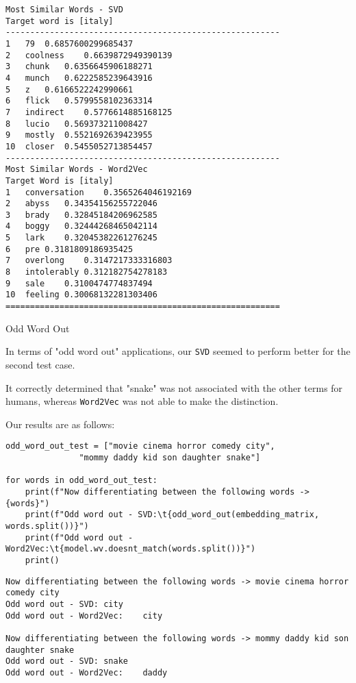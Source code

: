 \documentclass[12pt, letterpaper]{article}
\begin{document}
\begin{lstlisting}
Most Similar Words - SVD
Target word is [italy]
--------------------------------------------------------
1	79	0.6857600299685437
2	coolness	0.6639872949390139
3	chunk	0.6356645906188271
4	munch	0.6222585239643916
5	z	0.6166522242990661
6	flick	0.5799558102363314
7	indirect	0.5776614885168125
8	lucio	0.569373211008427
9	mostly	0.5521692639423955
10	closer	0.5455052713854457
--------------------------------------------------------
Most Similar Words - Word2Vec
Target Word is [italy]
1	conversation	0.3565264046192169
2	abyss	0.34354156255722046
3	brady	0.32845184206962585
4	boggy	0.32444268465042114
5	lark	0.32045382261276245
6	pre	0.3181809186935425
7	overlong	0.3147217333316803
8	intolerably	0.312182754278183
9	sale	0.3100474774837494
10	feeling	0.30068132281303406
========================================================
\end{lstlisting}

{\large Odd Word Out}

In terms of "odd word out" applications, our \texttt{SVD} seemed to perform better for the second test case.

It correctly determined that "snake" was not associated with the other terms for humans, whereas \texttt{Word2Vec} was not able to make the distinction.

Our results are as follows:

\begin{mdframed}[backgroundcolor=shadecolor]
\begin{verbatim}
odd_word_out_test = ["movie cinema horror comedy city", 
               "mommy daddy kid son daughter snake"]

for words in odd_word_out_test:
    print(f"Now differentiating between the following words -> {words}")
    print(f"Odd word out - SVD:\t{odd_word_out(embedding_matrix, words.split())}")
    print(f"Odd word out - Word2Vec:\t{model.wv.doesnt_match(words.split())}")
    print()
\end{verbatim}
\end{mdframed}

\begin{lstlisting}
Now differentiating between the following words -> movie cinema horror comedy city
Odd word out - SVD:	city
Odd word out - Word2Vec:	city

Now differentiating between the following words -> mommy daddy kid son daughter snake
Odd word out - SVD:	snake
Odd word out - Word2Vec:	daddy 
\end{lstlisting}
\end{document}
